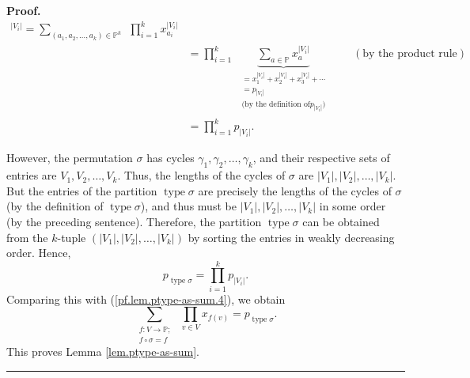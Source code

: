 \documentclass[numbers=enddot,12pt,final,onecolumn,notitlepage]{scrartcl}%
\numberwithin{exer}{section}
\theoremstyle{definition}
\newenvironment{proof}[1][Proof]{\noindent\textbf{#1.} }{\ \rule{0.5em}{0.5em}}
\let\sumnonlimits\sum
\let\prodnonlimits\prod
\renewcommand{\sum}{\sumnonlimits\limits}
\renewcommand{\prod}{\prodnonlimits\limits}
\newenvironment{vershort}{}{}
\begin{document}
\begin{vershort}
\begin{proof}
\begin{align}
{{}^{\left\vert V_{i}\right\vert }}=\sum_{\left(  a_{1},a_{2},\ldots
,a_{k}\right)  \in\mathbb{P}^{k}}\ \ \prod_{i=1}^{k}x_{a_{i}}^{\left\vert
V_{i}\right\vert }\nonumber\\
&  =\prod_{i=1}^{k}\ \ \underbrace{\sum_{a\in\mathbb{P}}x_{a}^{\left\vert
V_{i}\right\vert }}_{\substack{=x_{1}^{\left\vert V_{i}\right\vert }%
+x_{2}^{\left\vert V_{i}\right\vert }+x_{3}^{\left\vert V_{i}\right\vert
}+\cdots\\=p_{\left\vert V_{i}\right\vert }\\\text{(by the definition of
}p_{\left\vert V_{i}\right\vert }\text{)}}}\ \ \ \ \ \ \ \ \ \ \left(
\text{by the product rule}\right) \nonumber\\
&  =\prod_{i=1}^{k}p_{\left\vert V_{i}\right\vert }.
\label{pf.lem.ptype-as-sum.4}%
\end{align}


However, the permutation $\sigma$ has cycles $\gamma_{1},\gamma_{2}%
,\ldots,\gamma_{k}$, and their respective sets of entries are $V_{1}%
,V_{2},\ldots,V_{k}$. Thus, the lengths of the cycles of $\sigma$ are
$\left\vert V_{1}\right\vert ,\left\vert V_{2}\right\vert ,\ldots,\left\vert
V_{k}\right\vert $. But the entries of the partition $\operatorname*{type}%
\sigma$ are precisely the lengths of the cycles of $\sigma$ (by the definition
of $\operatorname*{type}\sigma$), and thus must be $\left\vert V_{1}%
\right\vert ,\left\vert V_{2}\right\vert ,\ldots,\left\vert V_{k}\right\vert $
in some order (by the preceding sentence). Therefore, the partition
$\operatorname*{type}\sigma$ can be obtained from the $k$-tuple $\left(
\left\vert V_{1}\right\vert ,\left\vert V_{2}\right\vert ,\ldots,\left\vert
V_{k}\right\vert \right)  $ by sorting the entries in weakly decreasing order.
Hence,%
\[
p_{\operatorname*{type}\sigma}=\prod_{i=1}^{k}p_{\left\vert V_{i}\right\vert
}.
\]
Comparing this with (\ref{pf.lem.ptype-as-sum.4}), we obtain
\[
\sum_{\substack{f:V\rightarrow\mathbb{P}\text{;}\\f\circ\sigma=f}%
}\ \ \prod_{v\in V}x_{f\left(  v\right)  }=p_{\operatorname*{type}\sigma}.
\]
This proves Lemma \ref{lem.ptype-as-sum}.
\end{proof}
\end{vershort}
\end{document}
